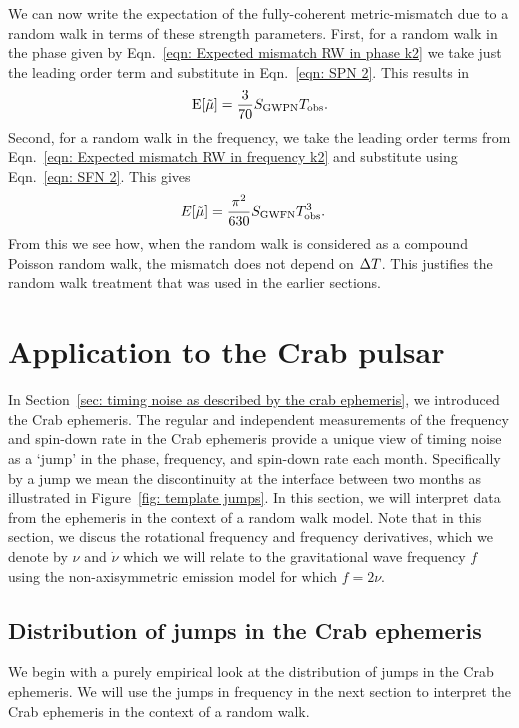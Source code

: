 \documentclass[../full_thesis/full_thesis.tex]{subfiles}
\begin{document}
We can now write the expectation of the fully-coherent metric-mismatch due to
a random walk in terms of these strength parameters. First, for a random walk
in the phase given by Eqn.~\eqref{eqn: Expected mismatch RW in phase k2} we
take just the leading order term and substitute in Eqn.~\eqref{eqn: SPN 2}.
This results in
\begin{align}
\textrm{E}[\tilde{\mu}] = \frac{3}{70} S_{\textrm{GWPN}} T_{\mathrm{obs}}.
\label{eqn: mu prediction phase}
\end{align}
Second, for a random walk in the frequency, we take the leading order terms
from Eqn.~\eqref{eqn: Expected mismatch RW in frequency k2} and substitute
using Eqn.~\eqref{eqn: SFN 2}. This gives
\begin{align}
E[\tilde{\mu}] & = \frac{\pi^{2}}{630} S_{\textrm{GWFN}} T_{\mathrm{obs}}^{3}.
\label{eqn: mu prediction}
\end{align}
From this we see how, when the random walk is considered as a compound Poisson
random walk, the mismatch does not depend on $\Delta T$. This justifies the
random walk treatment that was used in the earlier sections.

\section{Application to the Crab pulsar}
\label{sec: application to the crab}
In Section~\ref{sec: timing noise as described by the crab ephemeris}, we
introduced the Crab ephemeris.  The regular and independent measurements of the
frequency and spin-down rate in the Crab ephemeris provide a unique view of
timing noise as a `jump' in the phase, frequency, and spin-down rate each
month. Specifically by a jump we mean the discontinuity at the interface
between two months as illustrated in Figure~\ref{fig: template jumps}. In this
section, we will interpret data from the ephemeris in the context of a random
walk model. Note that in this section,
we discus the rotational frequency and frequency derivatives, which we denote
by $\nu$ and $\dot{\nu}$ which we will relate to the gravitational wave
frequency $f$ using the non-axisymmetric emission model for which $f=2\nu$.

\subsection{Distribution of jumps in the Crab ephemeris}
\label{sec: jumps}
\newcommand{\nuddotav}{\ddot{\nu}_{\textrm{av}}}
We begin with a purely empirical look at the distribution of jumps in the
Crab ephemeris. We will use the jumps in frequency in the next section to interpret the
Crab ephemeris in the context of a random walk.
\end{document}
